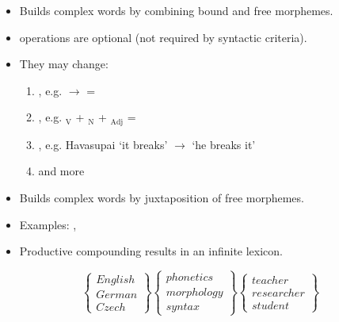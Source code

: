 \documentclass[a4paper,landscape,headrule,footrule]{foils}
\begin{document}
    
  \begin{itemize}
    \item Builds complex words by combining bound and free morphemes.
    \item {} operations are optional (not required by syntactic criteria).
    \item They may change:
      \begin{enumerate}
        \item {}, e.g.  $\rightarrow$  = 
        \item {}, e.g. $_{\mathrm{V}}$ + $_{\mathrm{N}}$ + $_{\mathrm{Adj}}$ = 
        \item {}, e.g. Havasupai  ‘it breaks’ $\rightarrow$  ‘he breaks it’
        \item and more
      \end{enumerate}
  \end{itemize}

  \begin{itemize}
    \item Builds complex words by juxtaposition of free morphemes.
    \item Examples: , \eng{[dish]+[washer]}
    \item Productive compounding results in an infinite lexicon.
  \end{itemize}
  \medskip
  \[
    \left\{\begin{array}{l}
        English \\
        German \\
        Czech
      \end{array}
      \right\}
    \left\{\begin{array}{l}
        phonetics \\
        morphology \\
        syntax
      \end{array}
      \right\}
    \left\{\begin{array}{l}
        teacher \\
        researcher \\
        student
      \end{array}
      \right\}
  \]
\end{document}
